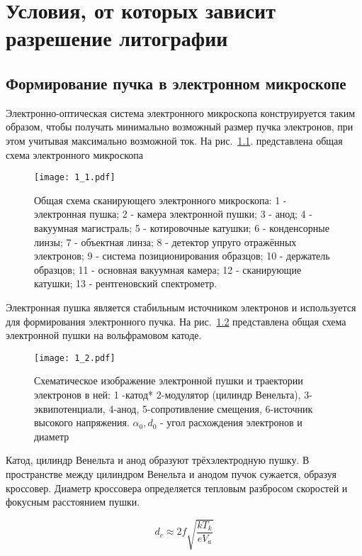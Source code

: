 \chapter{Условия, от которых зависит разрешение литографии}
\section{Формирование пучка в электронном микроскопе}

Электронно-оптическая система электронного микроскопа конструируется таким образом, чтобы получать минимально возможный размер пучка электронов, при этом учитывая максимально возможной ток. На рис.~\ref{fig:1}. представлена общая схема электронного микроскопа

\begin{figure}[H]
\center
\texttt{[image: 1\_1.pdf]}
\caption{Общая схема сканирующего электронного микроскопа: 1 - электронная пушка; 2 - камера электронной пушки; 3 - анод; 4 - вакуумная магистраль; 5 - котировочные катушки; 6 - конденсорные линзы; 7 - объектная линза; 8 - детектор упруго отражённых электронов; 9 - система позиционирования образцов; 10 - держатель образцов; 11 - основная вакуумная камера; 12 - сканирующие катушки; 13 - рентгеновский спектрометр.}
\label{fig:1}
\end{figure}

Электронная пушка является стабильным источником электронов и используется для формирования электронного пучка. На рис.~\ref{fig:2} представлена общая схема электронной пушки на вольфрамовом катоде.

\begin{figure}[H]
\center
\texttt{[image: 1\_2.pdf]}
\caption{ Схематическое изображение электронной пушки и траектории электронов в ней: 1 -катод* 2-модулятор (цилиндр Венельта), 3- эквипотенциали, 4-анод, 5-сопротивление смещения, 6-источник высокого напряжения. $\alpha_0, d_0$ - угол расхождения электронов и диаметр}
\label{fig:2}
\end{figure}

Катод, цилиндр Венельта и анод образуют трёхэлектродную пушку. В пространстве между цилиндром Венельта и анодом пучок сужается, образуя кроссовер.
Диаметр кроссовера определяется тепловым разбросом скоростей и фокусным расстоянием пушки.

\begin{equation}
d_c \approx 2f \sqrt{\frac{kT_k}{eV_a}}
\label{eq:A1}
\end{equation}

